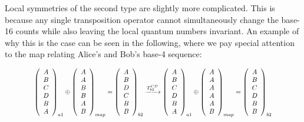 \documentclass{article}
\begin{document}
Local symmetries of the second type are slightly more complicated. This is because any single transposition operator cannot simultaneously change the base-16 counts while also leaving the local quantum numbers invariant. An example of why this is the case can be seen in the following, where we pay special attention to the map relating Alice's and Bob's base-4 sequence: 

\begin{equation}
\scalebox{0.8}{$\begin{aligned}
\left(\begin{array}{c}
A\\
B\\
C\\
D\\
B\\
A
\end{array}\right)_{a1}\oplus\left(\begin{array}{c}
A\\
A\\
B\\
B\\
A\\
B
\end{array}\right)_{map}=\left(\begin{array}{c}
A\\
B\\
D\\
C\\
B\\
B
\end{array}\right)_{b2}\xrightarrow{T^{CD}_{b2}}
\left(\begin{array}{c}
A\\
B\\
C\\
D\\
B\\
A
\end{array}\right)_{a1}\oplus\left(\begin{array}{c}
A\\
A\\
A\\
A\\
A\\
B
\end{array}\right)_{map}=\left(\begin{array}{c}
A\\
B\\
C\\
D\\
B\\
B
\end{array}\right)_{b2}
\end{aligned}$}
\label{eq: transposition 2}
\end{equation}
\end{document}
